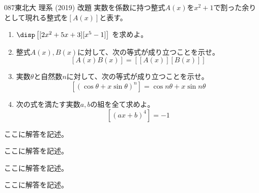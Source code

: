 \begin{prob}{087}{}{東北大 理系 (2019) 改題}
 実数を係数に持つ整式$A(x)$を$x^2+1$で割った余りとして現れる整式を$\left[A(x)\right]$と表す。
 \begin{enumerate}
  \item $\disp \left[ [2x^2+5x+3] [x^5-1] \right]$ を求めよ。
  \item 整式$A(x), B(x)$に対して、次の等式が成り立つことを示せ。
	\[ [A(x) B(x)]=\left[ [A(x)] [B(x)]\right] \]
  \item 実数$\theta$と自然数$n$に対して、次の等式が成り立つことを示せ。
	\[ \left[ (\cos\theta+x\sin\theta)^n \right] = \cos n\theta + x\sin n\theta \]
  \item 次の式を満たす実数$a, b$の組を全て求めよ。
	\[ \left[ (ax+b)^4 \right] = -1 \]
 \end{enumerate}
\end{prob}
ここに解答を記述。

ここに解答を記述。

ここに解答を記述。

ここに解答を記述。
